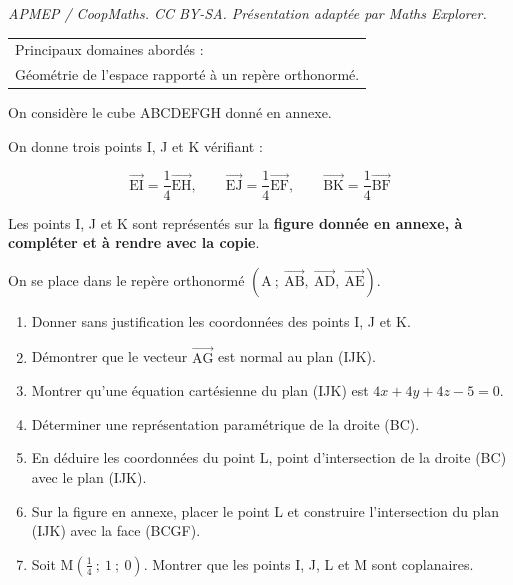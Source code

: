 \documentclass[10pt]{article}
\providecommand{\vect}[1]{\overrightarrow{#1}}
\begin{document}
\noindent\textit{APMEP / CoopMaths. CC BY-SA. Présentation adaptée par Maths Explorer.}\par\medskip
\medskip

\begin{tabular}{|l|}\hline
Principaux domaines abordés :\\
Géométrie de l'espace rapporté à un repère orthonormé.\\ \hline
\end{tabular}

\bigskip

On considère le cube ABCDEFGH donné en annexe. 

On donne trois points I, J et K vérifiant :

\[\vect{\text{EI}} = \dfrac{1}{4} \vect{\text{EH}},\qquad   \vect{\text{EJ}} = \dfrac{1}{4}  \vect{\text{EF}}, \qquad  \vect{\text{BK}} = \dfrac{1}{4}  \vect{\text{BF}}\]

Les points I, J et K sont représentés sur la \textbf{figure donnée en annexe, à compléter et à rendre avec la copie}.

On se place dans le repère orthonormé $\left(\text{A}~;~\vect{\text{AB}},~\vect{\text{AD}},~\vect{\text{AE}}\right)$.

\medskip

\begin{enumerate}
\item Donner sans justification les coordonnées des points I, J et K.
\item Démontrer que le vecteur $\vect{\text{AG}}$ est normal au plan (IJK).
\item Montrer qu'une équation cartésienne du plan (IJK) est $4x + 4y + 4z - 5 = 0$.
\item Déterminer une représentation paramétrique de la droite (BC).
\item En déduire les coordonnées du point L, point d'intersection de la droite (BC) avec le plan (IJK).
\item Sur la figure en annexe, placer le point L et construire l'intersection du plan (IJK) avec la face (BCGF).
\item Soit M$\left(\frac{1}{4}~;~1~;~0\right)$. Montrer que les points I, J, L et M sont coplanaires.
\end{enumerate}
\end{document}

